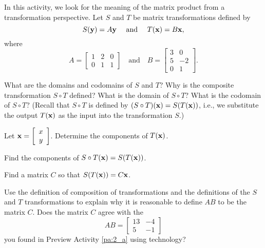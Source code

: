 \begin{activity} \label{act:A2.1_1} In this activity, we look for the meaning of the matrix product from a transformation perspective. Let $S$ and $T$ be matrix transformations defined by 
\[S(\mathbf{y}) = A \mathbf{y} \ \ \ \text{ and } \ \ \ T(\mathbf{x}) = B \mathbf{x},\]
where 
\[A = \left[ \begin{array}{ccc} 1&2&0 \\ 0&1&1 \end{array} \right]  \ \ \ \text{ and } \ \ \ B = \left[ \begin{array}{cr} 3&0\\5&-2 \\ 0&1 \end{array} \right].\]
	\ba
	\item What are the domains and codomains of $S$ and $T$? Why is the composite transformation $S \circ T$ defined? What is the domain of $S\circ T$? What is the codomain of $S\circ T$? (Recall that $S \circ T$ is defined by $(S \circ T)(\mathbf{x}) = S(T(\mathbf{x}))$, i.e., we substitute the output $T(\mathbf{x})$ as the input into the transformation $S$.)



	\item Let $\mathbf{x} = \left[ \begin{array}{c} x \\ y \end{array} \right]$. Determine the components of $T(\mathbf{x})$.
	


	\item Find the components of $S\circ T(\mathbf{x})=S(T(\mathbf{x}))$. 
	


	\item Find a matrix $C$ so that $S(T(\mathbf{x})) = C\mathbf{x}$. 
	


	\item Use the definition of composition of transformations and the definitions of the $S$ and $T$ transformations to explain why it is reasonable to define $AB$ to be the matrix $C$. Does the matrix $C$ agree with the 
\[AB = \left[ \begin{array}{cr} 13 & -4 \\ 5 & -1 \end{array} \right]\]
you found in Preview Activity \ref{pa:2_a} using technology?
	


	\ea
\end{activity}



